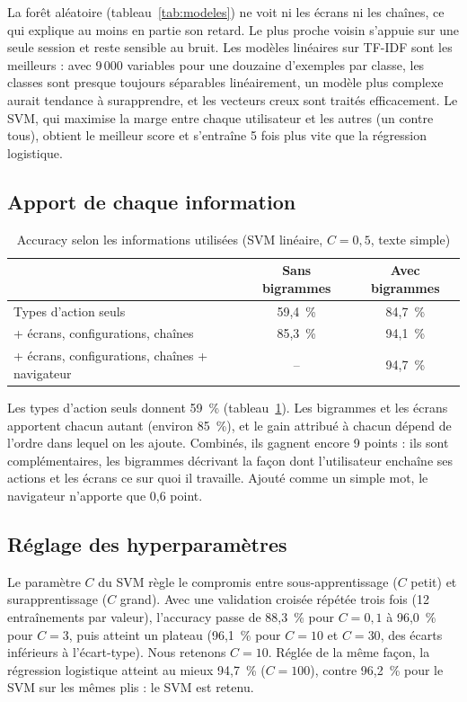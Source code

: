 \documentclass{rapportECL}
\begin{document}
La forêt aléatoire (tableau~\ref{tab:modeles}) ne voit ni les écrans ni les chaînes, ce qui explique au moins en partie son retard. Le plus proche voisin s'appuie sur une seule session et reste sensible au bruit. Les modèles linéaires sur TF-IDF sont les meilleurs : avec 9\,000 variables pour une douzaine d'exemples par classe, les classes sont presque toujours séparables linéairement, un modèle plus complexe aurait tendance à surapprendre, et les vecteurs creux sont traités efficacement. Le SVM, qui maximise la marge entre chaque utilisateur et les autres (un contre tous), obtient le meilleur score et s'entraîne 5 fois plus vite que la régression logistique.

\subsection{Apport de chaque information}

\begin{table}[!htbp]
\centering\small
\begin{tabular}{lcc}
\toprule
 & Sans bigrammes & Avec bigrammes \\
\midrule
Types d'action seuls & 59,4~\% & 84,7~\% \\
+ écrans, configurations, chaînes & 85,3~\% & 94,1~\% \\
+ écrans, configurations, chaînes + navigateur & -- & 94,7~\% \\
\bottomrule
\end{tabular}
\caption{Accuracy selon les informations utilisées (SVM linéaire, $C = 0{,}5$, texte simple)}
\label{tab:ablation}
\end{table}

Les types d'action seuls donnent 59~\% (tableau~\ref{tab:ablation}). Les bigrammes et les écrans apportent chacun autant (environ 85~\%), et le gain attribué à chacun dépend de l'ordre dans lequel on les ajoute. Combinés, ils gagnent encore 9 points : ils sont complémentaires, les bigrammes décrivant la façon dont l'utilisateur enchaîne ses actions et les écrans ce sur quoi il travaille. Ajouté comme un simple mot, le navigateur n'apporte que 0,6 point.

\subsection{Réglage des hyperparamètres}

Le paramètre $C$ du SVM règle le compromis entre sous-apprentissage ($C$ petit) et surapprentissage ($C$ grand). Avec une validation croisée répétée trois fois (12 entraînements par valeur), l'accuracy passe de 88,3~\% pour $C = 0{,}1$ à 96,0~\% pour $C = 3$, puis atteint un plateau (96,1~\% pour $C = 10$ et $C = 30$, des écarts inférieurs à l'écart-type). Nous retenons $C = 10$. Réglée de la même façon, la régression logistique atteint au mieux 94,7~\% ($C = 100$), contre 96,2~\% pour le SVM sur les mêmes plis : le SVM est retenu.
\end{document}
